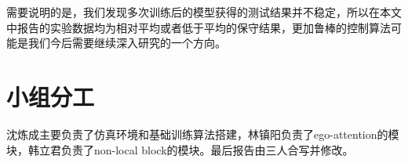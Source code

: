\documentclass[letterpaper, 10 pt, conference]{ieeeconf}  %
\begin{document}
需要说明的是，我们发现多次训练后的模型获得的测试结果并不稳定，所以在本文中报告的实验数据均为相对平均或者低于平均的保守结果，更加鲁棒的控制算法可能是我们今后需要继续深入研究的一个方向。

\addtolength{\textheight}{-1cm}   %









\section*{小组分工}
沈炼成主要负责了仿真环境和基础训练算法搭建，林镇阳负责了ego-attention的模块，韩立君负责了non-local block的模块。最后报告由三人合写并修改。







\end{document}
